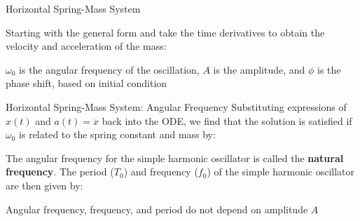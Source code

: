 \documentclass[12pt,compress,aspectratio=169]{beamer}
\begin{document}
\begin{frame}{Horizontal Spring-Mass System}

  
  Starting with the general form and take the time derivatives to obtain the
  velocity and acceleration of the mass:
 
  \vspace{-.2in}{\large
    \begin{align*}
      x(t)&=A\cos(\omega_0 t-\phi)\\
      v(t)&=-A\omega_0\sin(\omega_0 t-\phi)\\
      a(t)&=-A\omega_0^2\cos(\omega_0 t-\phi)=-\omega_0^2x
    \end{align*}
  }
  
  $\omega_0$ is the angular frequency of the oscillation, $A$ is the amplitude,
  and $\phi$ is the phase shift, based on initial condition
\end{frame}



\begin{frame}{Horizontal Spring-Mass System: Angular Frequency}
  Substituting expressions of $x(t)$ and $a(t)=\ddot x$ back into the ODE, we
  find that the solution is satisfied if $\omega_0$ is related to the spring
  constant and mass by:


  The angular frequency for the simple harmonic oscillator is called the
  \textbf{natural frequency}. The period ($T_0$) and frequency ($f_0$) of the
  simple harmonic oscillator are then given by:

  
  Angular frequency, frequency, and period do not depend on amplitude $A$
\end{frame}
\end{document}
